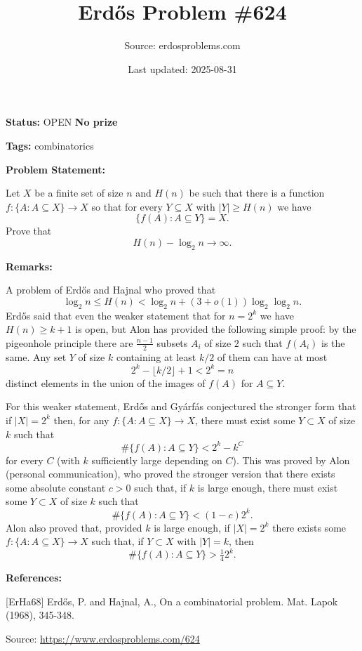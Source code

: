 \documentclass{article}
\title{Erd\H{o}s Problem \#624}
\date{Last updated: 2025-08-31}
\author{Source: erdosproblems.com}
\begin{document}
\maketitle

\noindent\textbf{Status:} OPEN \quad \textbf{No prize}

\noindent\textbf{Tags:} combinatorics

\medskip
\noindent\textbf{Problem Statement:}

Let $X$ be a finite set of size $n$ and $H(n)$ be such that there is a function $f:\{A : A\subseteq X\}\to X$ so that for every $Y\subseteq X$ with $\lvert Y\rvert \geq H(n)$ we have\[\{ f(A) : A\subseteq Y\}=X.\]Prove that\[H(n)-\log_2 n \to \infty.\]

\bigskip
\noindent\textbf{Remarks:}

A problem of Erd\H{o}s and Hajnal \cite{ErHa68} who proved that\[\log_2 n \leq H(n) < \log_2n +(3+o(1))\log_2\log_2n.\]Erd\H{o}s said that even the weaker statement that for $n=2^k$ we have $H(n)\geq k+1$ is open, but Alon has provided the following simple proof: by the pigeonhole principle there are $\frac{n-1}{2}$ subsets $A_i$ of size $2$ such that $f(A_i)$ is the same. Any set $Y$ of size $k$ containing at least $k/2$ of them can have at most\[2^k-\lfloor k/2\rfloor+1< 2^k=n\]distinct elements in the union of the images of $f(A)$ for $A\subseteq Y$. 

For this weaker statement, Erd\H{o}s and Gy\'{a}rf\'{a}s conjectured the stronger form that if $\lvert X\rvert=2^k$ then, for any $f:\{A : A\subseteq X\}\to X$, there must exist some $Y\subset X$ of size $k$ such that\[\#\{ f(A) : A\subseteq Y\}< 2^k-k^C\]for every $C$ (with $k$ sufficiently large depending on $C$). This was proved by Alon (personal communication), who proved the stronger version that there exists some absolute constant $c>0$ such that, if $k$ is large enough, there must exist some $Y\subset X$ of size $k$ such that\[\#\{ f(A) : A\subseteq Y\}<(1-c)2^k.\]Alon also proved that, provided $k$ is large enough, if $\lvert X\rvert=2^k$ there exists some $f:\{A: A\subseteq X\}\to X$ such that, if $Y\subset X$ with $\lvert Y\rvert=k$, then\[\#\{ f(A) : A\subseteq Y\}>\tfrac{1}{4}2^k.\]

\bigskip
\noindent\textbf{References:}

[ErHa68] Erd\H{o}s, P. and Hajnal, A., On a combinatorial problem. Mat. Lapok (1968), 345-348.

\bigskip
\noindent\small{Source: \url{https://www.erdosproblems.com/624}}
\end{document}
